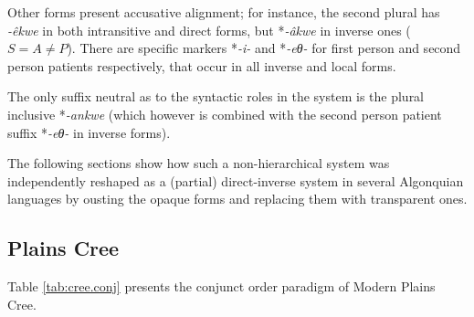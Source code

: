 \documentclass[twoside,a4paper,11pt]{article}
\newcommand{\ipa}[1]{{\phon\textit{#1}}}
\newcommand{\Σ}{\greek{Σ}}
\begin{document}
Other forms present accusative alignment; for instance, the second plural has \ipa{-êkwe} in both intransitive and direct forms, but *\ipa{-âkwe}  in inverse ones ($S = A \ne P$). There are specific markers *\ipa{-i-} and *\ipa{-eθ-} for first person and second person patients respectively, that occur in all inverse and local forms.

The only suffix neutral as to the syntactic roles in the system is the plural inclusive *\ipa{-ankwe} (which however is combined with 
the second person patient suffix *\ipa{-eθ-} in inverse forms).

The following sections show how such a non-hierarchical system was independently reshaped as a (partial) direct-inverse system in several Algonquian languages by ousting the opaque forms and replacing them with transparent ones. 

 

\subsection{Plains Cree}
Table \vref{tab:cree.conj} presents the conjunct order paradigm of Modern Plains Cree.
\end{document}
